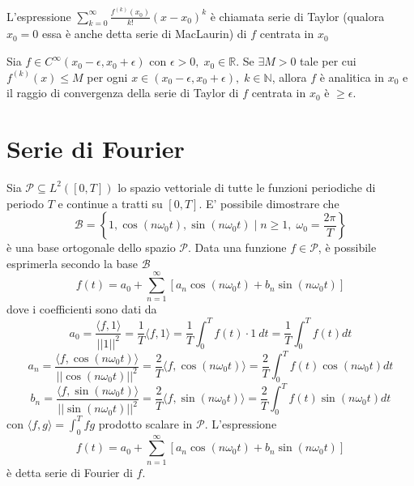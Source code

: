         L'espressione $\displaystyle \sum_{k = 0}^{\infty} \frac{f^{(k)}(x_{0})}{k!}(x - x_{0})^{k}$ è chiamata serie di Taylor (qualora $x_{0} = 0$ essa è anche detta serie di MacLaurin) di $f$ centrata in $x_{0}$

        \begin{theorem}
            Sia $f \in C^{\infty}(x_{0} - \epsilon, x_{0} + \epsilon)$ con $\epsilon > 0, \; x_{0} \in \mathbb{R}$.
            Se $\exists M > 0$ tale per cui $f^{(k)}(x) \leq M$ per ogni $x \in (x_{0} - \epsilon, x_{0} + \epsilon), \; k \in \mathbb{N}$, allora $f$ è analitica in $x_{0}$ e il raggio di convergenza della serie di Taylor di $f$ centrata in $x_{0}$ è $\geq \epsilon$.
        \end{theorem}



    \section{Serie di Fourier}
    Sia $\mathcal{P} \subseteq L^{2}([0, T])$ lo spazio vettoriale di tutte le funzioni periodiche di periodo $T$ e continue a tratti su $[0, T]$.
    E' possibile dimostrare che
    \[
        \mathcal{B} = \left\{ \left. 1, \cos(n\omega_{0}t), \sin(n \omega_{0} t) \;  \right| \; n \geq 1, \; \omega_{0} = \frac{2\pi}{T} \right\}
    \]
    è una base ortogonale dello spazio $\mathcal{P}$.
    Data una funzione $f \in \mathcal{P}$, è possibile esprimerla secondo la base $\mathcal{B}$
    \[
        f(t) = a_{0} + \sum_{n = 1}^{\infty} \left[ a_{n}\cos(n \omega_{0} t) + b_{n}\sin(n \omega_{0} t) \right]
    \]
    dove i coefficienti sono dati da
    \[
        a_{0} = \frac{\langle f, 1\rangle}{||1||^{2}} = \frac{1}{T} \langle f, 1 \rangle = \frac{1}{T} \int_{0}^{T} f(t) \cdot 1 \: dt = \frac{1}{T} \int_{0}^{T} f(t) dt
    \]
    \[
        a_{n} = \frac{\langle f, \cos(n \omega_{0} t) \rangle}{||\cos(n \omega_{0} t)||^{2}} = \frac{2}{T} \langle f, \cos(n \omega_{0} t) \rangle = \frac{2}{T} \int_{0}^{T} f(t)\cos(n \omega_{0} t) dt
    \]
    \[
        b_{n} = \frac{\langle f, \sin(n \omega_{0} t) \rangle}{||\sin(n \omega_{0} t)||^{2}} = \frac{2}{T} \langle f, \sin(n \omega_{0} t) \rangle = \frac{2}{T} \int_{0}^{T} f(t)\sin(n \omega_{0} t) dt
    \]
    con $\langle f, g \rangle = \int_{0}^{T}fg$ prodotto scalare in $\mathcal{P}$.
    L'espressione
    \[
        f(t) = a_{0} + \sum_{n = 1}^{\infty} \left[ a_{n}\cos(n \omega_{0} t) + b_{n}\sin(n \omega_{0} t) \right]
    \]
    è detta serie di Fourier di $f$.

